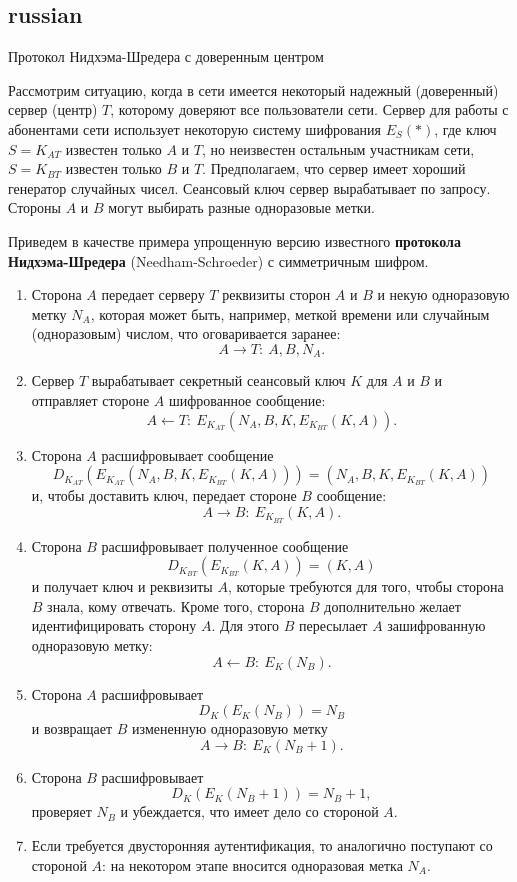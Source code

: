 \subsection{russian}{Протокол Нидхэма-Шредера с доверенным центром}

Рассмотрим ситуацию, когда в сети имеется некоторый надежный (доверенный) сервер (центр) $T$, которому доверяют все пользователи сети. Сервер для работы с абонентами сети использует некоторую систему шифрования $E_S(*)$, где ключ $S=K_{AT}$  известен только $A$ и $T$, но неизвестен остальным участникам сети, $S = K_{BT}$ известен только $B$ и  $T$. Предполагаем, что сервер имеет хороший генератор случайных чисел. Сеансовый ключ сервер вырабатывает по запросу. Стороны $A$ и $B$ могут выбирать разные одноразовые метки.

Приведем в качестве примера упрощенную версию известного \textbf{протокола Нидхэма-Шредера} (Needham-Schroeder) с симметричным шифром.
\begin{enumerate}
    \item Сторона $A$ передает  серверу $T$ реквизиты сторон $A$ и $B$  и некую одноразовую метку $N_A$, которая может быть, например, меткой времени или случайным (одноразовым) числом, что оговаривается заранее:
            \[ A \rightarrow T: ~ A, B, N_A. \]
    \item Сервер $T$ вырабатывает секретный сеансовый ключ $K$ для $A$ и $B$ и отправляет стороне $A$ шифрованное сообщение:
            \[ A \leftarrow T: ~ E_{K_{AT}}(N_A, B, K, E_{K_{BT}}(K, A)). \]
    \item Сторона $A$ расшифровывает сообщение
            \[ D_{K_{AT}}( E_{K_{AT}}(N_A, B, K, E_{K_{BT}}(K, A))) = (N_A, B, K, E_{K_{BT}}(K, A)) \]
        и, чтобы доставить ключ, передает стороне $B$ сообщение:
            \[ A \rightarrow B: ~ E_{K_{BT}}(K, A). \]
    \item Сторона $B$ расшифровывает полученное сообщение
            \[ D_{K_{BT}}( E_{K_{BT}}( K,A)) = (K,A) \]
        и получает ключ и реквизиты $A$, которые  требуются для того, чтобы сторона $B$ знала, кому отвечать. Кроме того, сторона $B$ дополнительно желает идентифицировать сторону $A$. Для этого $B$ пересылает $A$ зашифрованную одноразовую метку:
            \[ A \leftarrow B: ~ E_{K}(N_B). \]
    \item Сторона $A$ расшифровывает
            \[ D_K( E_K( N_B)) = N_B \]
        и возвращает $B$ измененную одноразовую метку
            \[ A \rightarrow B: ~ E_K(N_B + 1). \]
    \item Сторона $B$ расшифровывает
            \[ D_K( E_K( N_B + 1)) = N_B + 1, \]
        проверяет $N_B$ и убеждается, что имеет дело со стороной $A$.
    \item Если требуется двусторонняя аутентификация, то аналогично поступают со стороной $A$: на некотором этапе вносится одноразовая метка $N_A$.
\end{enumerate}
